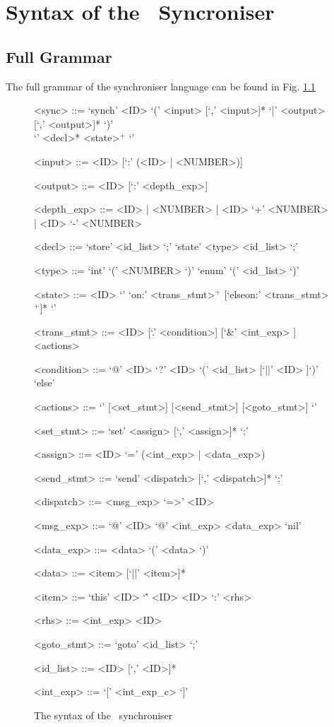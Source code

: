 \chapter{Syntax of the \ak\ Syncroniser}

  \section{Full Grammar} \label{sync_syntax}
The full grammar of the synchroniser language can be found in Fig. \ref{grammar_sss}
\setlength{\grammarindent}{8em} %
\begin{figure}%
\scriptsize
\begin{grammar}
<sync> ::= `synch' <ID> `(' <input> [`,' <input>]* `|' <output> [`,' <output>]* `)' \\
           `{' <decl>* <state>$^+$ `}'

<input>  ::= <ID> [`:' (<ID> | <NUMBER>)]

<output>  ::= <ID> [`:' <depth\_exp>]

<depth\_exp> ::= <ID> | <NUMBER> | <ID> `+' <NUMBER> | <ID> `-' <NUMBER>

<decl> ::= `store' <id\_list> `;'
        \alt `state' <type> <id\_list> `;'

<type> ::= `int' `(' <NUMBER> `)'
                  \alt `enum' `(' <id\_list> `)'

<state> ::= <ID> `{' `on:' <trans\_stmt>$^+$ [`elseon:' <trans\_stmt>$^+$]* `}'

<trans\_stmt> ::= <ID> [`.' <condition>] [`&' <int\_exp> ] <actions>

<condition> ::= `@' <ID>
             \alt `?' <ID>
             \alt [`?' <ID>] `(' <id\_list> [`||' <ID> ]`)'
             \alt `else'

<actions> ::= `{' [<set\_stmt>] [<send\_stmt>] [<goto\_stmt>] `}'

<set\_stmt> ::= `set' <assign> [`,' <assign>]* `;'

<assign> ::= <ID> `=' (<int\_exp> | <data\_exp>)

<send\_stmt> ::= `send' <dispatch> [`,' <dispatch>]*  `;'

<dispatch> ::= <msg\_exp> `=>' <ID>

<msg\_exp> ::= `@' <ID>
           \alt `@' <int\_exp>
           \alt [`?' <ID>] <data\_exp>
           \alt `nil'

<data\_exp> ::= <data>
             \alt `(' <data> `)'

<data> ::= <item> [`||' <item>]*

<item> ::= `this'
        \alt <ID>
        \alt `\'' <ID>
        \alt <ID> `:' <rhs>

<rhs> ::= <int\_exp>
          \alt <ID>

<goto\_stmt> ::= `goto' <id\_list> `;'

<id\_list> ::= <ID> [`,' <ID>]*

<int\_exp> ::= `[' <int\_exp\_c> `]'
\end{grammar}
\caption{The syntax of the \ak\ synchroniser}
\label{grammar_sss}
\end{figure}

